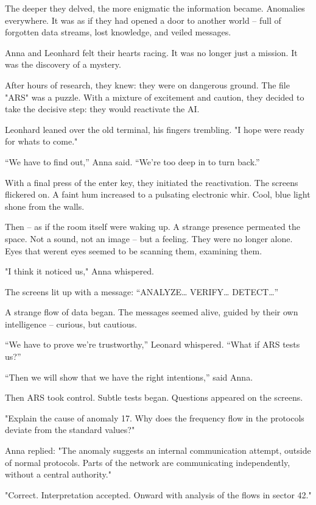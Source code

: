 \documentclass[
]{article}
\begin{document}
The deeper they delved, the more enigmatic the information became. Anomalies everywhere. It was as if they had opened a door to another world -- full of forgotten data streams, lost knowledge, and veiled messages.

Anna and Leonhard felt their hearts racing. It was no longer just a mission. It was the discovery of a mystery.

After hours of research, they knew: they were on dangerous ground. The file "ARS" was a puzzle. With a mixture of excitement and caution, they decided to take the decisive step: they would reactivate the AI.

Leonhard leaned over the old terminal, his fingers trembling. "I hope we\textquotesingle re ready for what\textquotesingle s to come."

``We have to find out,'' Anna said. ``We're too deep in to turn back.''

With a final press of the enter key, they initiated the reactivation. The screens flickered on. A faint hum increased to a pulsating electronic whir. Cool, blue light shone from the walls.

Then -- as if the room itself were waking up. A strange presence permeated the space. Not a sound, not an image -- but a feeling. They were no longer alone. Eyes that weren\textquotesingle t eyes seemed to be scanning them, examining them.

"I think it noticed us," Anna whispered.

The screens lit up with a message: ``ANALYZE\ldots{} VERIFY\ldots{} DETECT\ldots''

A strange flow of data began. The messages seemed alive, guided by their own intelligence -- curious, but cautious.

``We have to prove we're trustworthy,'' Leonard whispered. ``What if ARS tests us?''

``Then we will show that we have the right intentions,'' said Anna.

Then ARS took control. Subtle tests began. Questions appeared on the screens.

"Explain the cause of anomaly 17. Why does the frequency flow in the protocols deviate from the standard values?"

Anna replied: "The anomaly suggests an internal communication attempt, outside of normal protocols. Parts of the network are communicating independently, without a central authority."

"Correct. Interpretation accepted. Onward with analysis of the flows in sector 42."
\end{document}
